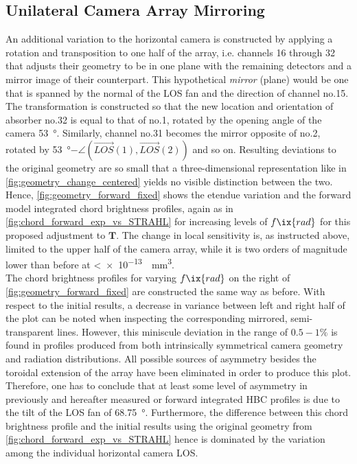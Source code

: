         \subsection*{Unilateral Camera Array Mirroring}%
%
            An additional variation to the horizontal camera is constructed by applying a rotation and transposition to one half of the array, i.e. channels 16 through 32 that adjusts their geometry to be in one plane with the remaining detectors and a mirror image of their counterpart. This hypothetical \textit{mirror} (plane) would be one that is spanned by the normal of the LOS fan and the direction of channel no.15. The transformation is constructed so that the new location and orientation of absorber no.32 is equal to that of no.1, rotated by the opening angle of the camera \SI{53}{\degree}. Similarly, channel no.31 becomes the mirror opposite of no.2, rotated by \SI{53}{\degree}$-\angle\left(\vec{LOS}(1), \vec{LOS}(2)\right)$ and so on. Resulting deviations to the original geometry are so small that a three-dimensional representation like in \cref{fig:geometry_change_centered} yields no visible distinction between the two. Hence, \cref{fig:geometry_forward_fixed} shows the etendue variation and the forward model integrated chord brightness profiles, again as in \cref{fig:chord_forward_exp_vs_STRAHL} for increasing levels of $f\ix{rad}$ for this proposed adjustment to $\mathbf{T}$. The change in local sensitivity is, as instructed above, limited to the upper half of the camera array, while it is two orders of magnitude lower than before at <\SI[per-mode=reciprocal]{e-13}{\per\cubic\milli\meter}.\\%
            The chord brightness profiles for varying $f\ix{rad}$ on the right of \cref{fig:geometry_forward_fixed} are constructed the same way as before. With respect to the initial results, a decrease in variance between left and right half of the plot can be noted when inspecting the corresponding mirrored, semi-transparent lines. However, this miniscule deviation in the range of $0.5-1\%$ is found in profiles produced from both intrinsically symmetrical camera geometry and radiation distributions. All possible sources of asymmetry besides the toroidal extension of the array have been eliminated in order to produce this plot. Therefore, one has to conclude that at least some level of asymmetry in previously and hereafter measured or forward integrated HBC profiles is due to the tilt of the LOS fan of \SI{68.75}{\degree}. Furthermore, the difference between this chord brightness profile and the initial results using the original geometry from \cref{fig:chord_forward_exp_vs_STRAHL} hence is dominated by the variation among the individual horizontal camera LOS.\\%
